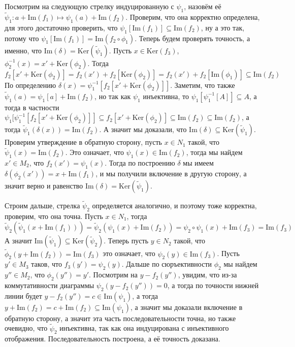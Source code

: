 \documentclass{article}
\begin{document}
\begin{enumerate}
        Посмотрим на следующую стрелку индуцированную с $\psi_1$, назовём её $\widetilde\psi_1:a+\text{Im}(f_1)\mapsto
        \psi_1(a)+\text{Im}(f_2)$. Проверим, что она корректно определена, для этого достаточно проверить,
        что $\psi_1[\text{Im}(f_1)]\subseteq\text{Im}(f_2)$, ну а это так, потому что $\psi_1[\text{Im}(f_1)]
        =\text{Im}(f_2\circ\phi_1)$. Теперь будем проверять точность, а именно, что $\text{Im}(\delta)=\text{Ker}(\widetilde\psi_1)$.
        Пусть $x\in\text{Ker}(f_3)$, $\phi_2^{-1}(x)=x'+\text{Ker}(\phi_2)$. Тогда
        \[f_2[x'+\text{Ker}(\phi_2)]=f_2(x')+f_2[\text{Ker}(\phi_2)]=f_2(x')+f_2[\text{Im}(\phi_1)]\subseteq \text{Im}(f_2)\]
        По определению $\delta(x)=\psi_1^{-1}[f_2[x'+\text{Ker}(\phi_2)]]$. Заметим, что также $\widetilde\psi_1(a)=
        \psi_1[a]+\text{Im}(f_2)$, но так как $\psi_1$ инъективна, то $\psi_1[\psi_1^{-1}[A]]\subseteq A$, а тогда в частности
        $\psi_1[\psi_1^{-1}[f_2[x'+\text{Ker}(\phi_2)]]\subseteq f_2[x'+\text{Ker}(\phi_2)]\subseteq\text{Im}(f_2)\subseteq\text{Im}(f_2)$,
        а тогда $\widetilde\psi_1(\delta(x))=\text{Im}(f_2)$. А значит мы доказали, что $\text{Im}(\delta)\subseteq\text{Ker}(\widetilde
        \psi_1)$. Проверим утверждение в обратную сторону, пусть $x\in N_1$ такой, что $\widetilde\psi_1(x)=\text{Im}(f_2)$. Это
        означает, что $\psi_1(x)\in\text{Im}(f_2)$, тогда мы найдем $x'\in M_2$, что $f_2(x')=\psi_1(x)$. Тогда по построению $\delta$
        мы имеем $\delta(\phi_2(x'))=x+\text{Im}(f_1)$, и мы получили включение в другую сторону, а значит верно и равенство
        $\text{Im}(\delta)=\text{Ker}(\widetilde\psi_1)$.

        Строим дальше, стрелка $\widetilde\psi_2$ определяется аналогично, и поэтому тоже корректна, проверим, что она точна.
        Пусть $x\in N_1$, тогда
        \[\widetilde\psi_2(\widetilde\psi_1(x+\text{Im}(f_1)))=\widetilde\psi_2(\psi_1(x)+\text{Im}(f_2))=\psi_2\circ\psi_1(x)
            +\text{Im}(f_3)=\text{Im}(f_3)\]
        А значит $\text{Im}(\widetilde\psi_1)\subseteq\text{Ker}(\widetilde\psi_2)$. Теперь пусть $y\in N_2$ такой, что
        $\widetilde\phi_2(y+\text{Im}(f_2))=\text{Im}(f_3)$ это означает, что $\psi_2(y)\in\text{Im}(f_3)$. Пусть $y'\in M_3$ таков, что
        $f_3(y')=\psi_2(y)$. Дальше по сюръективности $\phi_2$ мы найдем $y''\in M_2$, что $\phi_2(y'')=y'$. Посмотрим на
        $y-f_2(y'')$, увидим, что из-за коммутативности диаграммы $\psi_2(y-f_2(y''))=0$, а тогда по точности нижней линии будет
        $y-f_2(y'')=c\in\text{Im}(\psi_1)$, а тогда $y+\text{Im}(f_2)=c+\text{Im}(f_2)\subseteq\text{Im}(\psi_1)$, а значит мы
        доказали включение в обратную сторону, а значит эта часть последовательности точна, но также очевидно, что
        $\widetilde\psi_2$ инъективна, так как она индуцирована с инъективного отображения. Последовательность построена, а
        её точность доказана.


\end{enumerate}
\end{document}
